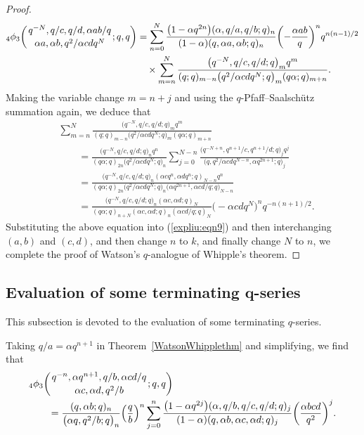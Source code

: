 \documentclass[pdftex]{sigma}
\numberwithin{equation}{section}
\begin{document}
\begin{proof}
\begin{align}
{_4\phi_3}\biggl({{q^{-N}, q/c, q/d, \alpha ab/q }\atop{\alpha a, \alpha b, q^2/{\alpha cd q^N}}}; q, q\biggr)
&{}=\sum_{n=0}^N \frac{\bigl(1-\alpha q^{2n}\bigr) (\alpha, q/a, q/b; q)_n}{(1-\alpha)(q, \alpha a, \alpha b; q)_n }\biggl(-\frac{\alpha ab}{q}\biggr)^n q^{n(n-1)/2}\nonumber\\
&{}\quad \times \sum_{m=n}^N \frac{\bigl(q^{-N}, q/c, q/d ; q\bigr)_m q^m}
{(q; q)_{m-n} \bigl(q^2/{\alpha cd q^N; q}\bigr)_{m} (q\alpha; q)_{m+n}}.\label{expliu:eqn9}
\end{align}
Making the variable change $m=n+j$ and using the $q$-Pfaff--Saalsch\"{u}tz summation again, we deduce that
\begin{align*}%
&\sum_{m=n}^N \frac{\bigl(q^{-N}, q/c, q/d ; q\bigr)_m q^m}
{(q; q)_{m-n} \bigl(q^2/{\alpha cd q^N}; q\bigr)_{m} (q\alpha; q)_{m+n}}\\
&\qquad{}=\frac{\bigl(q^{-N}, q/c, q/d; q\bigr)_n q^n}{(q\alpha; q)_{2n} \bigl(q^2/{\alpha cd q^N}; q\bigr)_n}
\sum_{j=0}^{N-n} \frac{\bigl(q^{-N+n}, q^{n+1}/c, q^{n+1}/d; q\bigr)_j q^{j}}
{\bigl(q, q^2/{\alpha cd q^{N-n}}, \alpha q^{2n+1}; q\bigr)_j}\nonumber\\	
&\qquad{}=\frac{\bigl(q^{-N}, q/c, q/d; q\bigr)_n (\alpha cq^n, \alpha dq^n; q)_{N-n} q^n}{(q\alpha; q)_{2n} \bigl(q^2/{\alpha cd q^N}; q\bigr)_n \bigl(\alpha q^{2n+1}, \alpha cd/q; q\bigr)_{N-n}}\nonumber\\
&\qquad{}=\frac{\bigl(q^{-N}, q/c, q/d; q\bigr)_n (\alpha c, \alpha d; q)_N}
{(q\alpha; q)_{n+N} (\alpha c, \alpha d; q)_n (\alpha cd/q; q)_N}
\bigl(-\alpha cd q^N\bigr)^n q^{-n(n+1)/2}. \nonumber
\end{align*}	
Substituting the above equation into (\ref{expliu:eqn9}) and then interchanging $(a, b)$ and $(c, d)$, and then change $n$ to $k$, and finally change $N$ to $n$, we complete the proof of Watson's $q$-analogue of Whipple's theorem.
\end{proof}

\subsection[Evaluation of some terminating q-series]{Evaluation of some terminating $\boldsymbol{q}$-series}
This subsection is devoted to the evaluation of some terminating $q$-series.

Taking $q/a=\alpha q^{n+1}$ in Theorem~\ref{WatsonWhipplethm} and simplifying, we find that \cite[equation~(2.1)]{Liu2013IJTN}
\begin{align}
	&{_4\phi_3}\biggl({{q^{-n}, \alpha q^{n+1}, q/b, \alpha cd/q }\atop{\alpha c, \alpha d, q^2/b}}; q, q\biggr)\nonumber\\
	&\qquad{}=\frac{(q, \alpha b; q)_n} {\bigl(\alpha q, q^2/b; q\bigr)_n } \Bigl(\frac{q} {b}\Bigr)^n \sum_{j=0}^n \frac{\bigl(1-\alpha q^{2j}\bigr) (\alpha, q/b, q/c, q/d; q)_j}
	{(1-\alpha)(q, \alpha b, \alpha c, \alpha d; q)_j}\biggl(\frac{\alpha bcd}{q^2}\biggr)^{j}.\label{newvalue:eqn1}
\end{align}
\end{document}
